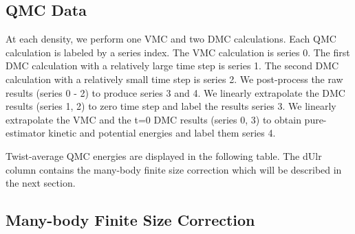 \subsection{QMC Data}

At each density, we perform one VMC and two DMC calculations. Each QMC calculation is labeled by a series index. The VMC calculation is series 0. The first DMC calculation with a relatively large time step is series 1. The second DMC calculation with a relatively small time step is series 2. We post-process the raw results (series 0 - 2) to produce series 3 and 4. We linearly extrapolate the DMC results (series 1, 2) to zero time step and label the results series 3. We linearly extrapolate the VMC and the t=0 DMC results (series 0, 3) to obtain pure-estimator kinetic and potential energies and label them series 4.

Twist-average QMC energies are displayed in the following table. The dUlr column contains the many-body finite size correction which will be described in the next section.

%
%
%
%
%
%
%

\subsection{Many-body Finite Size Correction}

